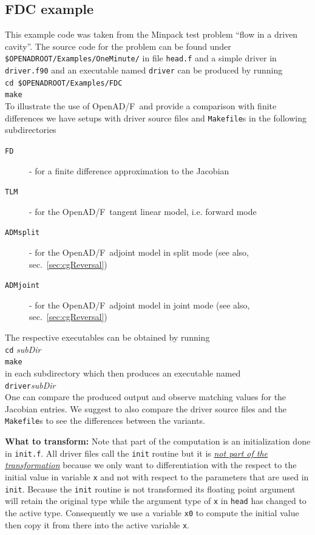 \documentclass{book}
\newcommand{\OpenADF}{OpenAD/F}
\newcommand{\refsec}[1]{{sec.~\ref{#1}}}
\begin{document}
\subsection{FDC example}\label{sec:fdcExample}
This example code was taken from the Minpack test problem ``flow in a driven cavity''. 
The source code for the problem can be found under \lstinline{$OPENADROOT/Examples/OneMinute/}%
in file \lstinline{head.f} and a simple driver in \lstinline{driver.f90} and an executable named \lstinline{driver} can be 
produced by running\\[1ex] 
\hspace*{.3cm}\lstinline{cd $OPENADROOT/Examples/FDC}\\ %
\hspace*{.3cm}\lstinline{make}\\[1ex]
To illustrate the use of \OpenADF\ and provide a comparison with 
finite differences we have setups with driver source files and \lstinline{Makefile}s in the following subdirectories
\begin{description}
\item[\tt FD] - for a finite difference approximation to the Jacobian
\item[\tt TLM] - for the  \OpenADF\ tangent linear model, i.e. forward mode
\item[\tt ADMsplit] - for the \OpenADF\ adjoint model in split mode (see also, \refsec{sec:cgReversal})
\item[\tt ADMjoint] - for the \OpenADF\ adjoint model in joint mode (see also, \refsec{sec:cgReversal})
\end{description}
The respective executables can be obtained by running \\[1ex]
\hspace*{.3cm}\lstinline{cd} {\em subDir}\\ 
\hspace*{.3cm}\lstinline{make} \\[1ex]
in each 
subdirectory which then produces an executable named\\[1ex]
\hspace*{.3cm}\lstinline{driver}{\em subDir}\\[1ex]
One can compare the produced output and observe matching values for the Jacobian entries. 
We suggest to also compare the driver source files and the \lstinline{Makefile}s
to see the differences between the variants. 

\noindent
{\bf What to transform:} Note that part of the computation is an initialization done in \lstinline{init.f}. All driver files call 
the \lstinline{init} routine but it is \underline{\em not part of the transformation} because we only want to differentiation 
with the respect to the initial value in variable \lstinline{x} and  not with respect to the parameters that are 
used in \lstinline{init}. Because the \lstinline{init} routine is not transformed its floating point argument will retain 
the original type while the argument type of \lstinline{x} in \lstinline{head} has changed to the active type. 
Consequently we use a variable \lstinline{x0} to compute the initial value then copy it from there into the active variable \lstinline{x}.    
\end{document}

